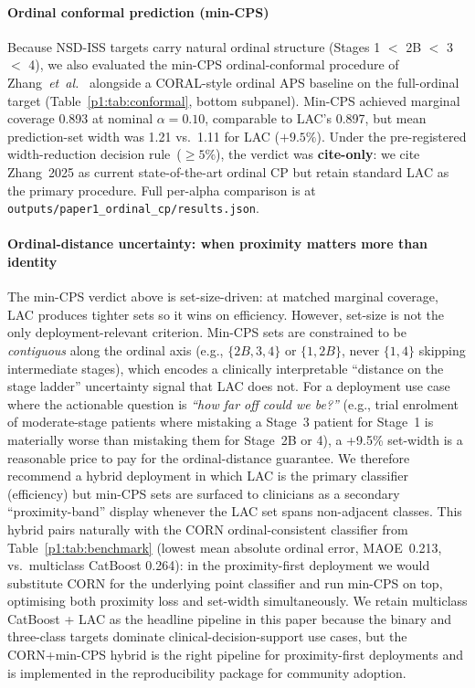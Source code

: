 \paragraph*{Ordinal conformal prediction (min-CPS)} Because NSD-ISS targets carry natural ordinal structure (Stages 1 $<$ 2B $<$ 3 $<$ 4), we also evaluated the min-CPS ordinal-conformal procedure of Zhang~\textit{et~al.}~\cite{zhang2025ordinalcp} alongside a CORAL-style ordinal APS baseline on the full-ordinal target (Table~\ref{p1:tab:conformal}, bottom subpanel). Min-CPS achieved marginal coverage 0.893 at nominal $\alpha{=}0.10$, comparable to LAC's 0.897, but mean prediction-set width was 1.21 vs.\ 1.11 for LAC ($+9.5\%$). Under the pre-registered width-reduction decision rule~($\geq 5\%$), the verdict was \textbf{cite-only}: we cite Zhang~2025 as current state-of-the-art ordinal CP but retain standard LAC as the primary procedure. Full per-alpha comparison is at \texttt{outputs/paper1\_ordinal\_cp/results.json}.

\paragraph*{Ordinal-distance uncertainty: when proximity matters more than identity} The min-CPS verdict above is set-size-driven: at matched marginal coverage, LAC produces tighter sets so it wins on efficiency. However, set-size is not the only deployment-relevant criterion. Min-CPS sets are constrained to be \emph{contiguous} along the ordinal axis (e.g., $\{2B, 3, 4\}$ or $\{1, 2B\}$, never $\{1, 4\}$ skipping intermediate stages), which encodes a clinically interpretable ``distance on the stage ladder'' uncertainty signal that LAC does not. For a deployment use case where the actionable question is \emph{``how far off could we be?''} (e.g., trial enrolment of moderate-stage patients where mistaking a Stage~3 patient for Stage~1 is materially worse than mistaking them for Stage~2B or 4), a +9.5\% set-width is a reasonable price to pay for the ordinal-distance guarantee. We therefore recommend a hybrid deployment in which LAC is the primary classifier (efficiency) but min-CPS sets are surfaced to clinicians as a secondary ``proximity-band'' display whenever the LAC set spans non-adjacent classes. This hybrid pairs naturally with the CORN ordinal-consistent classifier from Table~\ref{p1:tab:benchmark} (lowest mean absolute ordinal error, MAOE~0.213, vs.\ multiclass CatBoost 0.264): in the proximity-first deployment we would substitute CORN for the underlying point classifier and run min-CPS on top, optimising both proximity loss and set-width simultaneously. We retain multiclass CatBoost + LAC as the headline pipeline in this paper because the binary and three-class targets dominate clinical-decision-support use cases, but the CORN+min-CPS hybrid is the right pipeline for proximity-first deployments and is implemented in the reproducibility package for community adoption.

